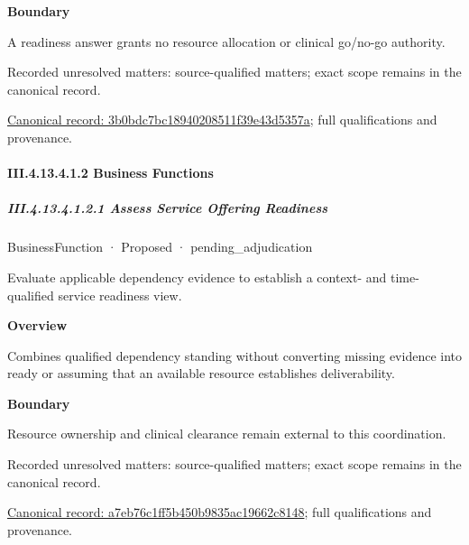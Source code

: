 \textbf{Boundary}



A readiness answer grants no resource allocation or clinical go/no-go authority.


{\small Recorded unresolved matters: source-qualified matters; exact scope remains in the canonical record.}\par
{\footnotesize \href{../../../../../../../continuum/business/business-service/3b0bdc7bc18940208511f39e43d5357a.md}{Canonical record: 3b0bdc7bc18940208511f39e43d5357a}; full qualifications and provenance.}\par
\paragraph*{III.4.13.4.1.2 Business Functions}
\label{navigation:III.4.13.4.1.2}

\subparagraph*{III.4.13.4.1.2.1 Assess Service Offering Readiness}
\label{navigation:III.4.13.4.1.2.1}

\label{element:a7eb76c1ff5b450b9835ac19662c8148}
{\small BusinessFunction · Proposed · pending\_adjudication}\par

Evaluate applicable dependency evidence to establish a context- and time-qualified service readiness view.



\textbf{Overview}



Combines qualified dependency standing without converting missing evidence into ready or assuming that an available resource establishes deliverability.



\textbf{Boundary}



Resource ownership and clinical clearance remain external to this coordination.


{\small Recorded unresolved matters: source-qualified matters; exact scope remains in the canonical record.}\par
{\footnotesize \href{../../../../../../../continuum/business/business-function/a7eb76c1ff5b450b9835ac19662c8148.md}{Canonical record: a7eb76c1ff5b450b9835ac19662c8148}; full qualifications and provenance.}\par
